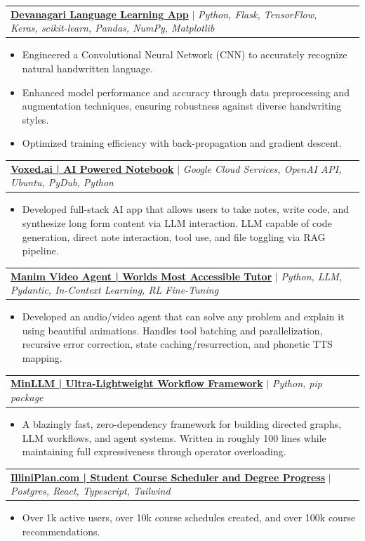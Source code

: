 \documentclass[letterpaper,10.99999999999999pt]{article}
\makeatletter
\newcommand{\resumeItem}[1]{
  \item\small{
    {#1 \vspace{-1pt}}
  }
}
\newcommand{\resumeProjectHeading}[2]{
    \item
    \begin{tabular*}{0.97\textwidth}{l@{\extracolsep{\fill}}r}
      \small#1 & #2 \\
    \end{tabular*}\vspace{-6pt}
}
\newcommand{\resumeItemListStart}{\begin{itemize}}
\newcommand{\resumeItemListEnd}{\end{itemize}\vspace{-5pt}}
\makeatother
\begin{document}
      \resumeProjectHeading
          {\textbf{\href{https://www.aidanandrews.info/projects/devanagari-web-app}{Devanagari Language Learning App}} $|$ \emph{Python, Flask, TensorFlow, Keras, scikit-learn, Pandas, NumPy, Matplotlib}}{}
          \resumeItemListStart
            \resumeItem{Engineered a Convolutional Neural Network (CNN) to accurately recognize natural handwritten language.}
            \resumeItem{Enhanced model performance and accuracy through data preprocessing and augmentation techniques, ensuring robustness against diverse handwriting styles.}
            \resumeItem{Optimized training efficiency with back-propagation and gradient descent.}
          \resumeItemListEnd

      \resumeProjectHeading
        {\textbf{\href{https://www.aidanandrews.info/projects/voxed}{Voxed.ai | AI Powered Notebook}} $|$ \emph{Google Cloud Services, OpenAI API, Ubuntu, PyDub, Python}}{}
        \resumeItemListStart
          \resumeItem{Developed full-stack AI app that allows users to take notes, write code, and synthesize long form content via LLM interaction. LLM capable of code generation, direct note interaction, tool use, and file toggling via RAG pipeline.}
        \resumeItemListEnd
        
      \resumeProjectHeading
        {\textbf{\href{https://github.com/aidanandrews22/manim-video-agent}{Manim Video Agent | Worlds Most Accessible Tutor}} $|$ \emph{Python, LLM, Pydantic, In-Context Learning, RL Fine-Tuning}}{}
        \resumeItemListStart
          \resumeItem{Developed an audio/video agent that can solve any problem and explain it using beautiful animations. Handles tool batching and parallelization, recursive error correction, state caching/resurrection, and phonetic TTS mapping.}
        \resumeItemListEnd

      \resumeProjectHeading
        {\textbf{\href{https://www.aidanandrews.info/projects/minllm}{MinLLM | Ultra-Lightweight Workflow Framework}} $|$ \emph{Python, pip package}}{}
        \resumeItemListStart
          \resumeItem{A blazingly fast, zero-dependency framework for building directed graphs, LLM workflows, and agent systems. Written in roughly 100 lines while maintaining full expressiveness through operator overloading.}
        \resumeItemListEnd

      \resumeProjectHeading
        {\textbf{\href{https://www.aidanandrews.info/projects/illini-plan}{IlliniPlan.com | Student Course Scheduler and Degree Progress}} $|$ \emph{Postgres, React, Typescript, Tailwind}}{}
        \resumeItemListStart
        \resumeItem{Over 1k active users, over 10k course schedules created, and over 100k course recommendations.}
        \resumeItemListEnd
        
\end{document}
